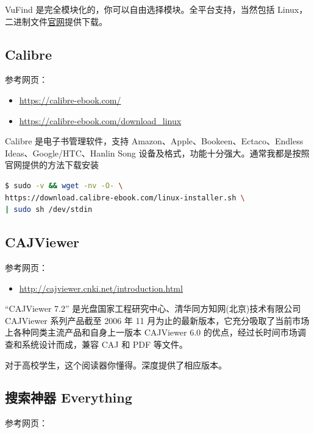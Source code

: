 \documentclass[doctor,openright,twoside]{sjtuthesis}
\providecommand{\tightlist}{%
    \setlength{\itemsep}{0pt}\setlength{\parskip}{0pt}}
\theoremstyle{plain}
\theoremstyle{definition}
\theoremstyle{remark}
\theoremstyle{ocrenumbox}
\theoremstyle{plain}
\begin{document}
VuFind 是完全模块化的，你可以自由选择模块。全平台支持，当然包括 Linux，二进制文件\href{https://vufind.org/vufind/downloads.html}{官网}提供下载。

\hypertarget{calibre}{%
\subsection{Calibre}\label{calibre}}

参考网页：

\begin{itemize}
\tightlist
\item
  \url{https://calibre-ebook.com/}
\item
  \url{https://calibre-ebook.com/download_linux}
\end{itemize}

Calibre 是电子书管理软件，支持 Amazon、Apple、Bookeen、Ectaco、Endless Ideas、Google/HTC、Hanlin Song 设备及格式，功能十分强大。通常我都是按照官网提供的方法下载安装

\begin{lstlisting}[language=bash, numbers=none]
$ sudo -v && wget -nv -O- \
https://download.calibre-ebook.com/linux-installer.sh \
| sudo sh /dev/stdin
\end{lstlisting}

\hypertarget{cajviewer}{%
\subsection{CAJViewer}\label{cajviewer}}

参考网页：

\begin{itemize}
\tightlist
\item
  \url{http://cajviewer.cnki.net/introduction.html}
\end{itemize}

``CAJViewer 7.2'' 是光盘国家工程研究中心、清华同方知网(北京)技术有限公司 CAJViewer 系列产品截至 2006 年 11 月为止的最新版本，它充分吸取了当前市场上各种同类主流产品和自身上一版本 CAJViewer 6.0 的优点，经过长时间市场调查和系统设计而成，兼容 CAJ 和 PDF 等文件。

对于高校学生，这个阅读器你懂得。深度提供了相应版本。

\hypertarget{everything}{%
\subsection{搜索神器 Everything}\label{everything}}

参考网页：
\end{document}
